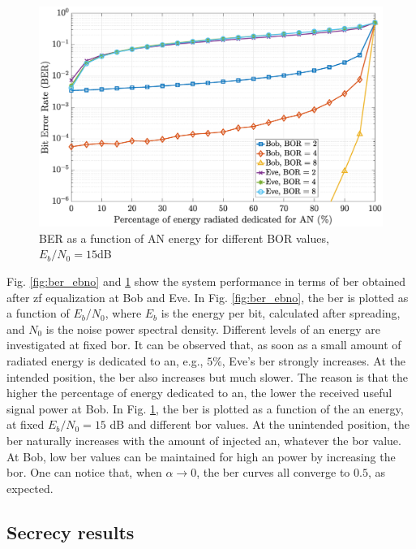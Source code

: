 \begin{figure}[htb!]
    \centering
    \centerline{\includegraphics[width = .65\textwidth]{graphs/ber_alpha_bor_ebno_globcom.eps}}
    \caption{BER as a function of AN energy for different BOR values, $E_b/N_0 = 15$dB}
    \label{fig:ber_alpha}
\end{figure}
Fig. \ref{fig:ber_ebno} and \ref{fig:ber_alpha} show the system performance in terms of \gls{ber} obtained after \gls{zf} equalization at Bob and Eve. In Fig. \ref{fig:ber_ebno}, the \gls{ber} is plotted as a function of $E_b/N_0$, where $E_b$ is the energy per bit, calculated after spreading, and $N_0$ is the noise power spectral density.  Different levels of \gls{an} energy are investigated at fixed \gls{bor}. It can be observed that, as soon as a small amount of radiated energy is dedicated to \gls{an}, e.g., $5\%$, Eve's \gls{ber} strongly increases. At the intended position, the \gls{ber} also increases but much slower. The reason is that the higher the percentage of energy dedicated to \gls{an}, the lower the received useful signal power at Bob. In Fig. \ref{fig:ber_alpha}, the \gls{ber} is plotted as a function of the \gls{an} energy, at fixed $E_b/N_0=15$ dB and different \gls{bor} values. At the unintended position, the \gls{ber} naturally increases with the amount of injected \gls{an}, whatever the \gls{bor} value. At Bob, low \gls{ber} values can be maintained for high \gls{an} power by increasing the \gls{bor}. One can notice that, when $\alpha \to 0$, the \gls{ber} curves all converge to $0.5$, as expected.






\subsection{Secrecy results}
\label{subsec:sec_result}
